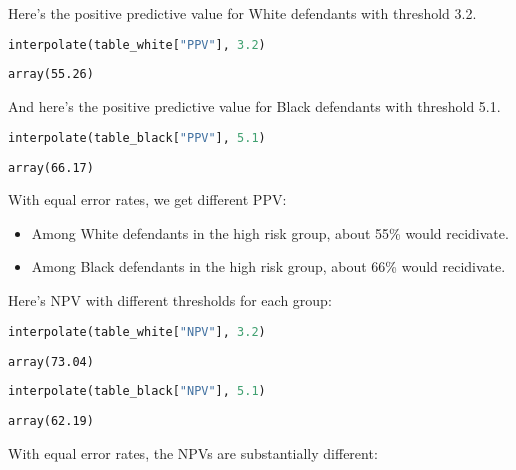 Here's the positive predictive value for White defendants with threshold
3.2.

\begin{lstlisting}[language=Python,style=source]
interpolate(table_white["PPV"], 3.2)
\end{lstlisting}

\begin{lstlisting}[style=output]
array(55.26)
\end{lstlisting}

And here's the positive predictive value for Black defendants with
threshold 5.1.

\begin{lstlisting}[language=Python,style=source]
interpolate(table_black["PPV"], 5.1)
\end{lstlisting}

\begin{lstlisting}[style=output]
array(66.17)
\end{lstlisting}

With equal error rates, we get different PPV:

\begin{itemize}
\item
  Among White defendants in the high risk group, about 55\% would
  recidivate.
\item
  Among Black defendants in the high risk group, about 66\% would
  recidivate.
\end{itemize}

Here's NPV with different thresholds for each group:

\begin{lstlisting}[language=Python,style=source]
interpolate(table_white["NPV"], 3.2)
\end{lstlisting}

\begin{lstlisting}[style=output]
array(73.04)
\end{lstlisting}

\begin{lstlisting}[language=Python,style=source]
interpolate(table_black["NPV"], 5.1)
\end{lstlisting}

\begin{lstlisting}[style=output]
array(62.19)
\end{lstlisting}

\pagebreak

With equal error rates, the NPVs are substantially different:

